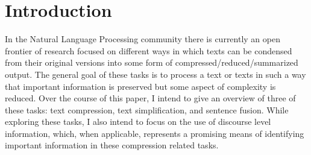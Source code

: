 \section{Introduction}



{In the Natural Language Processing community there is currently an open frontier of research focused on different ways in which texts can be condensed from their original versions into some form of compressed/reduced/summarized output. The general goal of these tasks is to process a text or texts in such a way that important information is preserved but some aspect of complexity is reduced.  Over the course of this paper, I intend to give an overview of three of these tasks: text compression, text simplification, and sentence fusion. While exploring these tasks, I also intend to focus on the use of discourse level information, which, when applicable, represents a promising means of identifying important information in these compression related tasks.}

